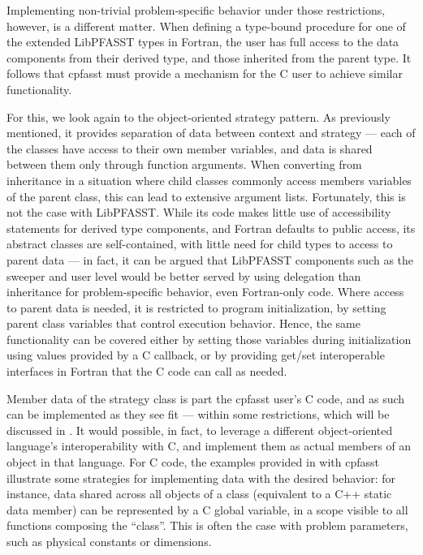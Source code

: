 Implementing non-trivial problem-specific behavior under those restrictions, however, is a different matter. When defining a type-bound procedure for one of the extended LibPFASST types in Fortran, the user has full access to the data components from their derived type, and those inherited from the parent type. It follows that cpfasst must provide a mechanism for the C user to achieve similar functionality.

For this, we look again to the object-oriented strategy pattern. As previously mentioned, it provides separation of data between context and strategy --- each of the classes have access to their own member variables, and data is shared between them only through function arguments. When converting from inheritance in a situation where child classes commonly access members variables of the parent class, this can lead to extensive argument lists. Fortunately, this is not the case with LibPFASST. While its code makes little use of accessibility statements for derived type components, and Fortran defaults to public access, its abstract classes are self-contained, with little need for child types to access to parent data --- in fact, it can be argued that LibPFASST components such as the sweeper and user level would be better served by using delegation than inheritance for problem-specific behavior, even Fortran-only code. Where access to parent data is needed, it is restricted to program initialization, by setting parent class variables that control execution behavior. Hence, the same functionality can be covered either by setting those variables during initialization using values provided by a C callback, or by providing get/set interoperable interfaces in Fortran that the C code can call as needed. 

Member data of the strategy class is part the cpfasst user's C code, and as such can be implemented as they see fit --- within some restrictions, which will be discussed in . It would possible, in fact, to leverage a different object-oriented language's interoperability with C, and implement them as actual members of an object in that language. For C code, the examples provided in with cpfasst illustrate some strategies for implementing data with the desired behavior: for instance, data shared across all objects of a class (equivalent to a C++ static data member) can be represented by a C global variable, in a scope visible to all functions composing the ``class''. This is often the case with problem parameters, such as physical constants or dimensions.

